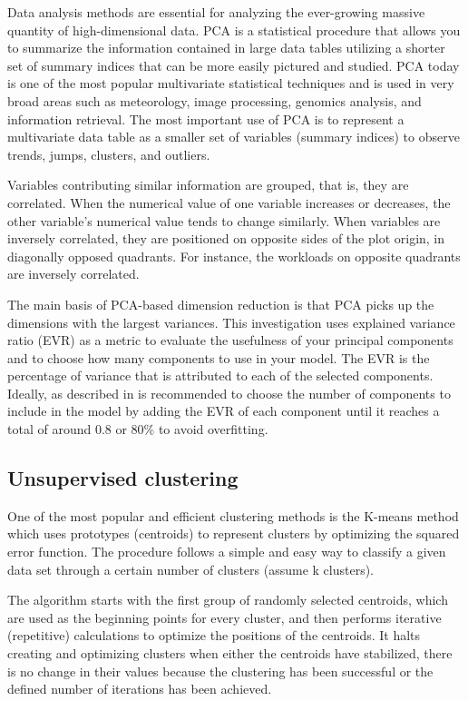 \documentclass[]{PhDEngScITESO-R}
\begin{document}
Data analysis methods are essential for analyzing the ever-growing massive quantity of high-dimensional data. PCA is a statistical procedure that allows you to summarize the information contained in large data tables utilizing a shorter set of summary indices that can be more easily pictured and studied. PCA today is one of the most popular multivariate statistical techniques and is used in very broad areas such as meteorology, image processing, genomics analysis, and information retrieval.  The most important use of PCA is to represent a multivariate data table as a smaller set of variables (summary indices) to observe trends, jumps, clusters, and outliers. 

Variables contributing similar information are grouped, that is, they are correlated. When the numerical value of one variable increases or decreases, the other variable's numerical value tends to change similarly. When variables are inversely correlated, they are positioned on opposite sides of the plot origin, in diagonally opposed quadrants. For instance, the workloads on opposite quadrants are inversely correlated.

The main basis of PCA-based dimension reduction is that PCA picks up the dimensions with the largest variances. This investigation uses explained variance ratio (EVR) as a metric to evaluate the usefulness of your principal components and to choose how many components to use in your model. The EVR is the percentage of variance that is attributed to each of the selected components. Ideally, as described in \cite{Zhuo} is recommended to choose the number of components to include in the model by adding the EVR of each component until it reaches a total of around 0.8 or 80\% to avoid overfitting.

\subsection{Unsupervised clustering}
\label{subsec: Unsupervised clustering }

One of the most popular and efficient clustering methods is the K-means method \cite{macqueen_1966} which uses prototypes (centroids) to represent clusters by optimizing the squared error function. The procedure follows a simple and easy way to classify a given data set through a certain number of clusters (assume k clusters).

The algorithm starts with the first group of randomly selected centroids, which are used as the beginning points for every cluster, and then performs iterative (repetitive) calculations to optimize the positions of the centroids. It halts creating and optimizing clusters when either the centroids have stabilized, there is no change in their values because the clustering has been successful or the defined number of iterations has been achieved.
\end{document}

